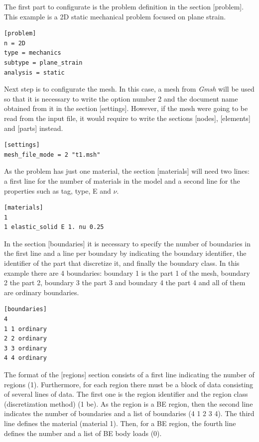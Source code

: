 \documentclass[A4]{article}
\begin{document}
The first part to configurate is the problem definition in the section [problem]. This example is a 2D static mechanical problem focused on plane strain.  

\begin{Verbatim}	
[problem]
n = 2D
type = mechanics
subtype = plane_strain
analysis = static
\end{Verbatim}

Next step is to configurate the mesh. In this case, a mesh from \textit{Gmsh} will be used so that it is necessary to write the option number 2 and the document name obtained from it in the section [settings]. However, if the mesh were going to be read from the input file, it would require to write the sections [nodes], [elements] and [parts] instead.

\begin{Verbatim}	
[settings]
mesh_file_mode = 2 "t1.msh"
\end{Verbatim}

As the problem has just one material, the section [materials] will need two lines: a first line for the number of materials in the model and a second line for the properties such as tag, type, E and $\nu$.

\begin{Verbatim}	
[materials]
1
1 elastic_solid E 1. nu 0.25
\end{Verbatim}

In the section [boundaries] it is necessary to specify the number of boundaries in the first line and a line per boundary by indicating the boundary identifier, the identifier of the part that discretize it, and finally the boundary class. In this example there are 4 boundaries: boundary 1 is the part 1 of the mesh, boundary 2 the part 2, boundary 3 the part 3 and boundary 4 the part 4 and all of them are ordinary boundaries.

\begin{Verbatim}	
[boundaries]
4
1 1 ordinary
2 2 ordinary
3 3 ordinary
4 4 ordinary
\end{Verbatim}

The format of the [regions] section consists of a first line indicating the number of regions (1). Furthermore, for each region there must be a block of data consisting of several lines of data. The first one is the region identifier and the region class (discretization method) (1 be). As the region is a BE region, then the second line indicates the number of boundaries and a list of boundaries (4 1 2 3 4). The third line defines the material (material 1). Then, for a BE region, the fourth line defines the number and a list of BE body loads (0).
\end{document}
